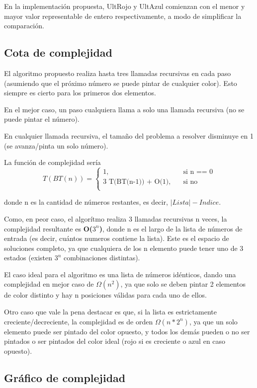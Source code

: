 	En la implementación propuesta, UltRojo y UltAzul comienzan con el menor y mayor valor representable de entero respectivamente, a modo de simplificar la comparación.

	\subsection{Cota de complejidad}

	El algoritmo propuesto realiza hasta tres llamadas recursivas en cada paso (asumiendo que el próximo número se puede pintar de cualquier color). Esto siempre es cierto para los primeros dos elementos.

	En el mejor caso, un paso cualquiera llama a solo una llamada recursiva (no se puede pintar el número).

	En cualquier llamada recursiva, el tamaño del problema a resolver disminuye en 1 (se avanza/pinta un solo número).

	La función de complejidad sería
	\[
	T(BT(n)) =
		\begin{cases}
			\text{1,} &\quad\text{si n == 0}\\
			\text{3 T(BT(n-1)) + O(1),} &\quad\text{si no} \\
		\end{cases}
	\]

	donde n es la cantidad de números restantes, es decir, $|Lista| - Indice$.

	Como, en peor caso, el algorítmo realiza 3 llamadas recursivas n veces, la complejidad resultante es \textbf{O($3^n$)}, donde n es el largo de la lista de números de entrada (es decir, cuántos numeros contiene la lista). Este es el espacio de soluciones completo, ya que cualquiera de los n elemento puede tener uno de 3 estados (existen $3^n$ combinaciones distintas).

	El caso ideal para el algoritmo es una lista de números idénticos, dando una complejidad en mejor caso de $\Omega(n^2)$, ya que solo se deben pintar 2 elementos de color distinto y hay n posiciones válidas para cada uno de ellos.

	Otro caso que vale la pena destacar es que, si la lista es estrictamente creciente/decreciente, la complejidad es de orden $\Omega(n * 2^n)$, ya que un solo elemento puede ser pintado del color opuesto, y todos los demás pueden o no ser pintados o ser pintados del color ideal (rojo si es creciente o azul en caso opuesto).

	\pagebreak
	\subsection{Gráfico de complejidad}

